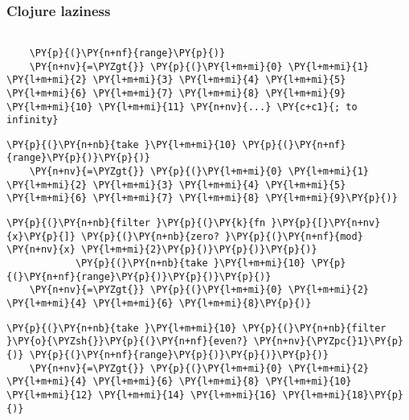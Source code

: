 \begin{frame}[fragile]
  \frametitle{Clojure laziness}
  \begin{Verbatim}[commandchars=\\\{\}]

    \PY{p}{(}\PY{n+nf}{range}\PY{p}{)}
    \PY{n+nv}{=\PYZgt{}} \PY{p}{(}\PY{l+m+mi}{0} \PY{l+m+mi}{1} \PY{l+m+mi}{2} \PY{l+m+mi}{3} \PY{l+m+mi}{4} \PY{l+m+mi}{5} \PY{l+m+mi}{6} \PY{l+m+mi}{7} \PY{l+m+mi}{8} \PY{l+m+mi}{9} \PY{l+m+mi}{10} \PY{l+m+mi}{11} \PY{n+nv}{...} \PY{c+c1}{; to infinity}
  \end{Verbatim}

  \pause

  \begin{Verbatim}[commandchars=\\\{\}]
    \PY{p}{(}\PY{n+nb}{take }\PY{l+m+mi}{10} \PY{p}{(}\PY{n+nf}{range}\PY{p}{)}\PY{p}{)}
    \PY{n+nv}{=\PYZgt{}} \PY{p}{(}\PY{l+m+mi}{0} \PY{l+m+mi}{1} \PY{l+m+mi}{2} \PY{l+m+mi}{3} \PY{l+m+mi}{4} \PY{l+m+mi}{5} \PY{l+m+mi}{6} \PY{l+m+mi}{7} \PY{l+m+mi}{8} \PY{l+m+mi}{9}\PY{p}{)}
  \end{Verbatim}

  \pause

  \begin{Verbatim}[commandchars=\\\{\}]
    \PY{p}{(}\PY{n+nb}{filter }\PY{p}{(}\PY{k}{fn }\PY{p}{[}\PY{n+nv}{x}\PY{p}{]} \PY{p}{(}\PY{n+nb}{zero? }\PY{p}{(}\PY{n+nf}{mod} \PY{n+nv}{x} \PY{l+m+mi}{2}\PY{p}{)}\PY{p}{)}\PY{p}{)}
            \PY{p}{(}\PY{n+nb}{take }\PY{l+m+mi}{10} \PY{p}{(}\PY{n+nf}{range}\PY{p}{)}\PY{p}{)}\PY{p}{)}
    \PY{n+nv}{=\PYZgt{}} \PY{p}{(}\PY{l+m+mi}{0} \PY{l+m+mi}{2} \PY{l+m+mi}{4} \PY{l+m+mi}{6} \PY{l+m+mi}{8}\PY{p}{)}
  \end{Verbatim}

  \pause

  \begin{Verbatim}[commandchars=\\\{\}]
    \PY{p}{(}\PY{n+nb}{take }\PY{l+m+mi}{10} \PY{p}{(}\PY{n+nb}{filter }\PY{o}{\PYZsh{}}\PY{p}{(}\PY{n+nf}{even?} \PY{n+nv}{\PYZpc{}1}\PY{p}{)} \PY{p}{(}\PY{n+nf}{range}\PY{p}{)}\PY{p}{)}\PY{p}{)}
    \PY{n+nv}{=\PYZgt{}} \PY{p}{(}\PY{l+m+mi}{0} \PY{l+m+mi}{2} \PY{l+m+mi}{4} \PY{l+m+mi}{6} \PY{l+m+mi}{8} \PY{l+m+mi}{10} \PY{l+m+mi}{12} \PY{l+m+mi}{14} \PY{l+m+mi}{16} \PY{l+m+mi}{18}\PY{p}{)}
  \end{Verbatim}
\end{frame}

